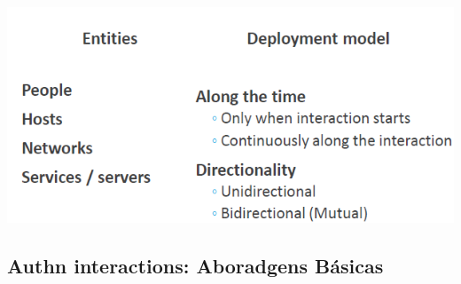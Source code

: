 \documentclass{article}
\begin{document}
\vspace{2mm}

\begin{center}
  \includegraphics[scale=0.55]{20}
\end{center}

\pagebreak

\subsection{Authn interactions: Aboradgens Básicas}
\end{document}
